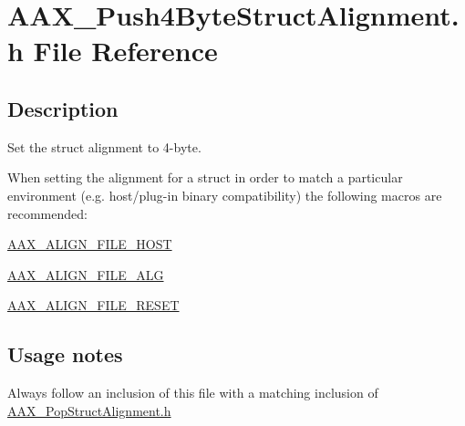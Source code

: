 \hypertarget{a00285}{}\section{A\+A\+X\+\_\+\+Push4\+Byte\+Struct\+Alignment.\+h File Reference}
\label{a00285}


\subsection{Description}
Set the struct alignment to 4-\/byte. 

When setting the alignment for a struct in order to match a particular environment (e.\+g. host/plug-\/in binary compatibility) the following macros are recommended\+: \begin{DoxyItemize}
\item \hyperlink{a00149_acbef7ed7d077bc9812cb56417e1ad325}{A\+A\+X\+\_\+\+A\+L\+I\+G\+N\+\_\+\+F\+I\+L\+E\+\_\+\+H\+O\+S\+T} \item \hyperlink{a00149_a8fbeac3c5db5ac694e85a021ed74dc9e}{A\+A\+X\+\_\+\+A\+L\+I\+G\+N\+\_\+\+F\+I\+L\+E\+\_\+\+A\+L\+G} \item \hyperlink{a00149_a8aaaefcc3d87025e84d5ccb99b650a87}{A\+A\+X\+\_\+\+A\+L\+I\+G\+N\+\_\+\+F\+I\+L\+E\+\_\+\+R\+E\+S\+E\+T}\end{DoxyItemize}
\hypertarget{a00285_AAX_Push4ByteStructAlignment_usagenotes}{}\subsection{Usage notes}\label{a00285_AAX_Push4ByteStructAlignment_usagenotes}
\begin{DoxyItemize}
\item Always follow an inclusion of this file with a matching inclusion of \hyperlink{a00281}{A\+A\+X\+\_\+\+Pop\+Struct\+Alignment.\+h}\end{DoxyItemize}
